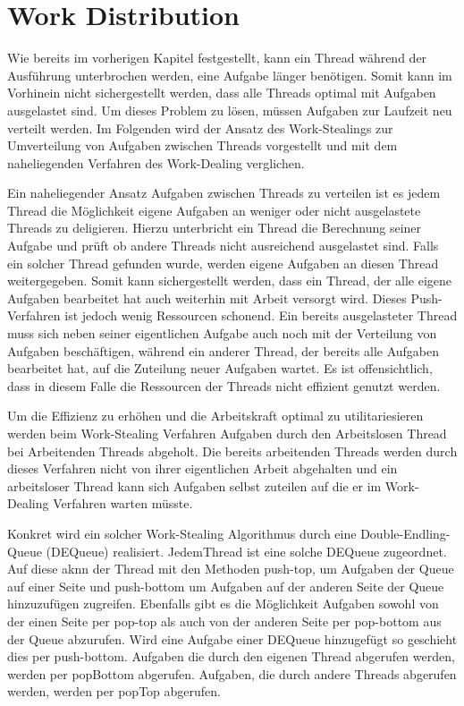 \section{Work Distribution}


Wie bereits im vorherigen Kapitel festgestellt, kann ein Thread während der Ausführung unterbrochen werden, eine Aufgabe länger benötigen. Somit kann im Vorhinein nicht sichergestellt werden, dass alle Threads optimal mit Aufgaben ausgelastet sind. Um dieses Problem zu lösen, müssen Aufgaben zur Laufzeit neu verteilt werden. Im Folgenden wird der Ansatz des Work-Stealings zur Umverteilung von Aufgaben zwischen Threads vorgestellt und mit dem naheliegenden Verfahren des Work-Dealing verglichen.

Ein naheliegender Ansatz Aufgaben zwischen Threads zu verteilen ist es jedem Thread die Möglichkeit eigene Aufgaben an weniger oder nicht ausgelastete Threads zu deligieren. Hierzu unterbricht ein Thread die Berechnung seiner Aufgabe und prüft ob andere Threads nicht ausreichend ausgelastet sind. Falls ein solcher Thread gefunden wurde, werden eigene Aufgaben an diesen Thread weitergegeben. Somit kann sichergestellt werden, dass ein Thread, der alle eigene Aufgaben bearbeitet hat auch weiterhin mit Arbeit versorgt wird.
Dieses Push-Verfahren ist jedoch wenig Ressourcen schonend. Ein bereits ausgelasteter Thread muss sich neben seiner eigentlichen Aufgabe auch noch mit der Verteilung von Aufgaben beschäftigen, während ein anderer Thread, der bereits alle Aufgaben bearbeitet hat, auf die Zuteilung neuer Aufgaben wartet. Es ist offensichtlich, dass in diesem Falle die Ressourcen der Threads nicht effizient genutzt werden.

Um die Effizienz zu erhöhen und die Arbeitskraft optimal zu utilitariesieren werden beim Work-Stealing Verfahren Aufgaben durch den Arbeitslosen Thread bei Arbeitenden Threads abgeholt. Die bereits arbeitenden Threads werden durch dieses Verfahren nicht von ihrer eigentlichen Arbeit abgehalten und ein arbeitsloser Thread kann sich Aufgaben selbst zuteilen auf die er im Work-Dealing Verfahren warten müsste.

Konkret wird ein solcher Work-Stealing Algorithmus durch eine Double-Endling-Queue (DEQueue) realisiert. JedemThread ist eine solche DEQueue zugeordnet. Auf diese aknn der Thread mit den Methoden push-top, um Aufgaben der Queue auf einer Seite und push-bottom um Aufgaben auf der anderen Seite der Queue hinzuzufügen zugreifen. Ebenfalls gibt es die Möglichkeit Aufgaben sowohl von der einen Seite per pop-top als auch von der anderen Seite per pop-bottom aus der Queue abzurufen. Wird eine Aufgabe einer DEQueue hinzugefügt so geschieht dies per push-bottom. Aufgaben die durch den eigenen Thread abgerufen werden, werden per popBottom abgerufen. Aufgaben, die durch andere Threads abgerufen werden, werden per popTop abgerufen.

